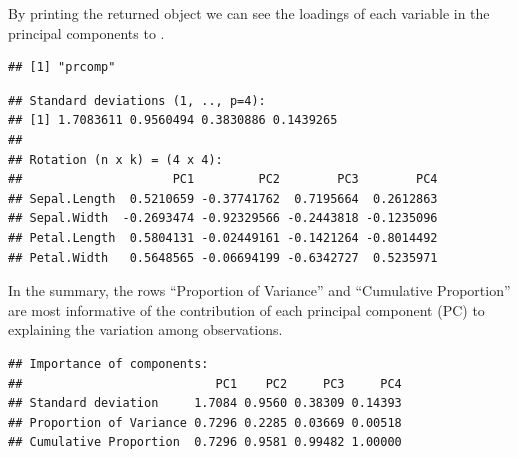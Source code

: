 \documentclass[krantz2]{krantz}\usepackage{knitr}
\begin{document}
\begin{knitrout}\footnotesize
{}\color{fgcolor}\begin{kframe}
\begin{alltt}
 \hlkwb{<-} \hlstd{(iris[}\hlstd{(}\hlstd{,} \hlstd{,}
                    \hlstd{,} \hlstd{)],}
              \hlstd{=} \hlstd{,}
              \hlstd{=} \hlstd{)}
\end{alltt}
\end{kframe}
\end{knitrout}

By printing the returned object we can see the loadings of each variable in the principal components  to .
\begin{knitrout}\footnotesize
{}\color{fgcolor}\begin{kframe}
\begin{alltt}
\end{alltt}
\begin{verbatim}
## [1] "prcomp"
\end{verbatim}
\begin{alltt}
\end{alltt}
\begin{verbatim}
## Standard deviations (1, .., p=4):
## [1] 1.7083611 0.9560494 0.3830886 0.1439265
##
## Rotation (n x k) = (4 x 4):
##                     PC1         PC2        PC3        PC4
## Sepal.Length  0.5210659 -0.37741762  0.7195664  0.2612863
## Sepal.Width  -0.2693474 -0.92329566 -0.2443818 -0.1235096
## Petal.Length  0.5804131 -0.02449161 -0.1421264 -0.8014492
## Petal.Width   0.5648565 -0.06694199 -0.6342727  0.5235971
\end{verbatim}
\end{kframe}
\end{knitrout}

In the summary, the rows ``Proportion of Variance'' and ``Cumulative Proportion'' are most informative of the contribution of each principal component (PC) to explaining the variation among observations.

\begin{knitrout}\footnotesize
{}\color{fgcolor}\begin{kframe}
\begin{alltt}
\end{alltt}
\begin{verbatim}
## Importance of components:
##                           PC1    PC2     PC3     PC4
## Standard deviation     1.7084 0.9560 0.38309 0.14393
## Proportion of Variance 0.7296 0.2285 0.03669 0.00518
## Cumulative Proportion  0.7296 0.9581 0.99482 1.00000
\end{verbatim}
\end{kframe}
\end{knitrout}
\end{document}
